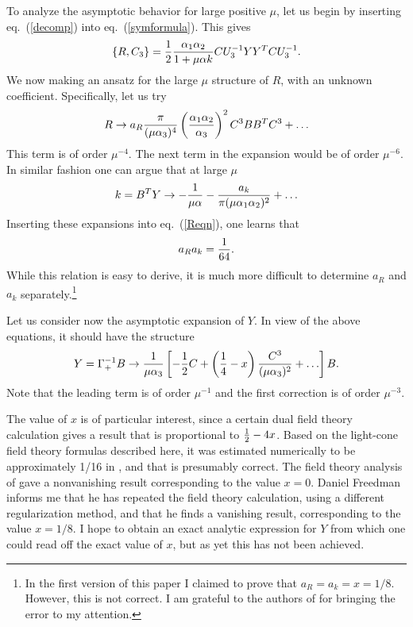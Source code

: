 \documentclass[a4paper,12pt]{article}
\begin{document}
To analyze the asymptotic behavior for large positive $\mu$, let
us begin by inserting eq.~(\ref{decomp}) into
eq.~(\ref{symformula}). This gives
\begin{equation} \label{Reqn}
\{R,C_3\} = {1\over 2} {\alpha_1\alpha_2 \over 1 + \mu \alpha k}
CU_3^{-1} Y Y^T CU_3^{-1}.
\end{equation}
We now making an ansatz for the large $\mu$ structure of $R$, with
an unknown coefficient. Specifically, let us try
\begin{equation}
R \to a_R {\pi \over (\mu \alpha_3)^4} \left( {\alpha_1 \alpha_2
\over \alpha_3}\right)^2 {C^3}B B^T {C^3} + \ldots
\end{equation}
This term is of order $\mu^{-4}$. The next term in the expansion
would be of order $\mu^{-6}$. In similar fashion one can argue
that at large $\mu$
\begin{equation}
k =B^T Y \to - {1 \over \mu \alpha}  - {a_k \over \pi (\mu
\alpha_1 \alpha_2)^2} +\ldots
\end{equation}
Inserting these expansions into eq.~(\ref{Reqn}), one learns that
\begin{equation}
a_R a_k = {1 \over 64}.
\end{equation}
While this relation is easy to derive, it is much more difficult
to determine $a_R$ and $a_k$ separately.\footnote{In the first
version of this paper I claimed to prove that $a_R =a_k =x=1/8$.
However, this is not correct. I am grateful to the authors of
\cite{Klebanov:2002mp} for bringing the error to my attention.}

Let us consider now the asymptotic expansion of $Y$. In view of
the above equations, it should have the structure
\begin{equation}\label{Yasym}
Y = \Gamma_+^{-1} B \to {1 \over \mu \alpha_3} \left[ - {1\over 2}
C + \left( {1 \over 4} - x\right) {C^3 \over (\mu \alpha_3)^2} +
\ldots \right] B.
\end{equation}
Note that the leading term is of order $\mu^{-1}$ and the first
correction is of order $\mu^{-3}$.

The value of $x$ is of particular interest, since a certain dual
field theory calculation gives a result that is proportional to
${1\over 2} - 4x$. Based on the light-cone field theory formulas
described here, it was estimated numerically to be approximately
1/16 in \cite{Klebanov:2002mp}, and that is presumably correct.
The field theory analysis of \cite{Chu:2002pd} gave a nonvanishing
result corresponding to the value $x=0$. Daniel Freedman informs
me that he has repeated the field theory calculation, using a
different regularization method, and that he finds a vanishing
result, corresponding to the value $x=1/8$. I hope to obtain an
exact analytic expression for $Y$ from which one could read off
the exact value of $x$, but as yet this has not been achieved.
\end{document}
